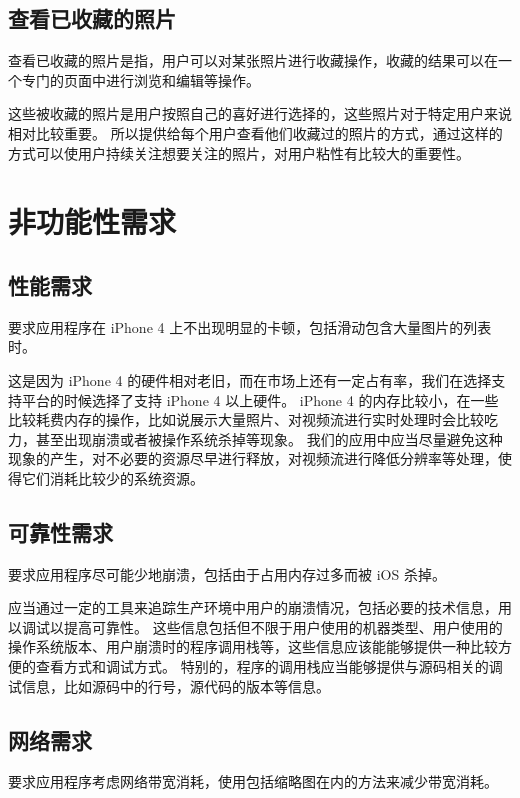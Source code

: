 \subsection{查看已收藏的照片}

查看已收藏的照片是指，用户可以对某张照片进行收藏操作，收藏的结果可以在一个专门的页面中进行浏览和编辑等操作。

这些被收藏的照片是用户按照自己的喜好进行选择的，这些照片对于特定用户来说相对比较重要。
所以提供给每个用户查看他们收藏过的照片的方式，通过这样的方式可以使用户持续关注想要关注的照片，对用户粘性有比较大的重要性。

\section{非功能性需求}

\subsection{性能需求}

要求应用程序在 iPhone 4 上不出现明显的卡顿，包括滑动包含大量图片的列表时。

这是因为 iPhone 4 的硬件相对老旧，而在市场上还有一定占有率，我们在选择支持平台的时候选择了支持 iPhone 4 以上硬件。
iPhone 4 的内存比较小，在一些比较耗费内存的操作，比如说展示大量照片、对视频流进行实时处理时会比较吃力，甚至出现崩溃或者被操作系统杀掉等现象。
我们的应用中应当尽量避免这种现象的产生，对不必要的资源尽早进行释放，对视频流进行降低分辨率等处理，使得它们消耗比较少的系统资源。

\subsection{可靠性需求}

要求应用程序尽可能少地崩溃，包括由于占用内存过多而被 iOS 杀掉。

应当通过一定的工具来追踪生产环境中用户的崩溃情况，包括必要的技术信息，用以调试以提高可靠性。
这些信息包括但不限于用户使用的机器类型、用户使用的操作系统版本、用户崩溃时的程序调用栈等，这些信息应该能能够提供一种比较方便的查看方式和调试方式。
特别的，程序的调用栈应当能够提供与源码相关的调试信息，比如源码中的行号，源代码的版本等信息。

\subsection{网络需求}

要求应用程序考虑网络带宽消耗，使用包括缩略图在内的方法来减少带宽消耗。

